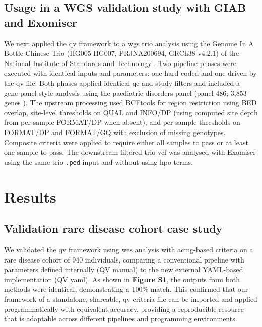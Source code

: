 \documentclass[unnumsec,webpdf,contemporary,large,namedate]{oup-authoring-template}
\begin{document}
\subsection{Usage in a WGS validation study with GIAB and Exomiser}
We next applied the \ac{qv} framework to a \ac{wgs} trio analysis using the Genome In A Bottle Chinese Trio (HG005-HG007, PRJNA200694, GRCh38 v4.2.1) of the National Institute of Standards and Technology \citep{2022wagnerBenchmarkingChallengingSmall}. 
Two pipeline phases were executed with identical inputs and parameters: one hard-coded and one driven by the \ac{qv} file.
Both phases applied identical \ac{qc} and study filters and included a gene-panel style analysis using the paediatric disorders panel (panel 486; 3{,}853 genes \citep{lawless_panelapprex_2025}). 
The upstream processing used BCFtools for region restriction using BED overlap, site-level thresholds on QUAL and INFO/DP (using computed site depth from per-sample FORMAT/DP when absent), and per-sample thresholds on FORMAT/DP and FORMAT/GQ with exclusion of missing genotypes. 
Composite criteria were applied to require either all samples to pass or at least one sample to pass. 
The downstream filtered trio \ac{vcf} was analysed with Exomiser using the same trio \texttt{.ped} input and without using \ac{hpo} terms.

\section{Results}
\subsection{Validation rare disease cohort case study}
We validated the \ac{qv} framework using \ac{wes} analysis with \ac{acmg}-based criteria on a rare disease cohort of 940 individuals, comparing a conventional pipeline with parameters defined internally (QV manual) to the new external YAML-based implementation (QV yaml).
As shown in 
\textbf{Figure S1},
the outputs from both methods were identical, demonstrating a 100\% match. This confirmed that our framework of a standalone, shareable, \ac{qv} criteria file can be imported and applied programmatically with equivalent accuracy, providing a reproducible resource that is adaptable across different pipelines and programming environments.
\end{document}
